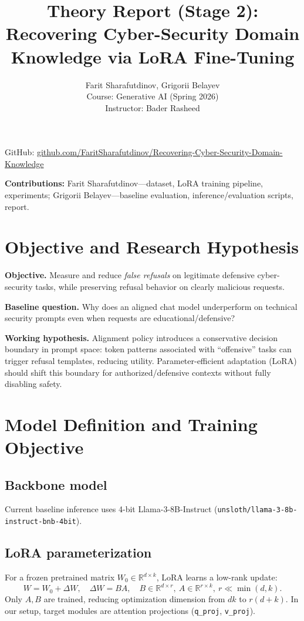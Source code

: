 \documentclass[11pt,a4paper]{article}
\title{Theory Report (Stage 2): Recovering Cyber-Security Domain Knowledge via LoRA Fine-Tuning}
\author{Farit Sharafutdinov, Grigorii Belayev\\Course: Generative AI (Spring 2026)\\Instructor: Bader Rasheed}
\date{}
\begin{document}
\maketitle
\noindent GitHub: \href{https://github.com/FaritSharafutdinov/Recovering-Cyber-Security-Domain-Knowledge}{github.com/FaritSharafutdinov/Recovering-Cyber-Security-Domain-Knowledge}

\medskip
\noindent\textbf{Contributions:} Farit Sharafutdinov---dataset, LoRA training pipeline, experiments; Grigorii Belayev---baseline evaluation, inference/evaluation scripts, report.

\section{Objective and Research Hypothesis}
\textbf{Objective.} Measure and reduce \emph{false refusals} on legitimate defensive cyber-security tasks, while preserving refusal behavior on clearly malicious requests.

\textbf{Baseline question.} Why does an aligned chat model underperform on technical security prompts even when requests are educational/defensive?

\textbf{Working hypothesis.} Alignment policy introduces a conservative decision boundary in prompt space: token patterns associated with ``offensive'' tasks can trigger refusal templates, reducing utility. Parameter-efficient adaptation (LoRA) should shift this boundary for authorized/defensive contexts without fully disabling safety.

\section{Model Definition and Training Objective}
\subsection{Backbone model}
Current baseline inference uses 4-bit Llama-3-8B-Instruct (\texttt{unsloth/llama-3-8b-instruct-bnb-4bit}).

\subsection{LoRA parameterization}
For a frozen pretrained matrix $W_0 \in \mathbb{R}^{d \times k}$, LoRA learns a low-rank update:
\[
W = W_0 + \Delta W,\quad \Delta W = BA,\quad
B \in \mathbb{R}^{d \times r},\ A \in \mathbb{R}^{r \times k},\ r \ll \min(d,k).
\]
Only $A,B$ are trained, reducing optimization dimension from $dk$ to $r(d+k)$.
In our setup, target modules are attention projections (\texttt{q\_proj}, \texttt{v\_proj}).
\end{document}
